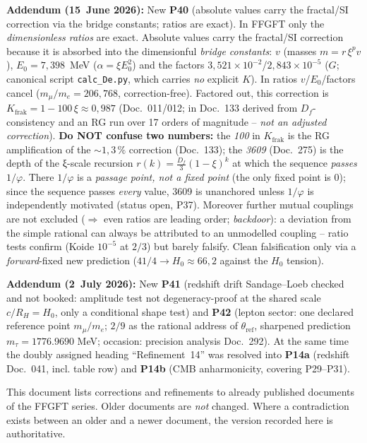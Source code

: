 \textbf{Addendum (15~June 2026):} New \textbf{P40} (absolute values carry the
fractal/SI correction via the bridge constants; ratios are exact). In FFGFT only the
\emph{dimensionless ratios} are exact. Absolute values carry the fractal/SI correction
because it is absorbed into the dimensionful \emph{bridge constants}: $v$ (masses
$m=r\,\xi^{p}v$), $E_0=7{,}398$~MeV ($\alpha=\xi E_0^2$) and the factors
$3{,}521\times10^{-2}$/$2{,}843\times10^{-5}$ ($G$; canonical script \texttt{calc\_De.py},
which carries \emph{no} explicit $K$). In ratios $v$/$E_0$/factors cancel
($m_\mu/m_e=206{,}768$, correction-free). Factored out, this correction is
$K_{\text{frak}}=1-100\,\xi\approx0{,}987$ (Doc.~011/012; in Doc.~133 derived from
$D_f$-consistency and an RG run over 17 orders of magnitude -- \emph{not an adjusted
correction}). \textbf{Do NOT confuse two numbers:} the \emph{100} in $K_{\text{frak}}$ is
the RG amplification of the ${\sim}1{,}3\,\%$ correction (Doc.~133); the \emph{3609}
(Doc.~275) is the depth of the ξ-scale recursion $r(k)=\tfrac{D_f}{3}(1-\xi)^k$ at which the
sequence \emph{passes} $1/\varphi$. There $1/\varphi$ is a \emph{passage point, not a fixed
point} (the only fixed point is $0$); since the sequence passes \emph{every} value, 3609 is
unanchored unless $1/\varphi$ is independently motivated (status open, P37). Moreover further
mutual couplings are not excluded ($\Rightarrow$ even ratios are leading order;
\emph{backdoor}): a deviation from the simple rational can always be attributed to an
unmodelled coupling -- ratio tests confirm (Koide $10^{-5}$ at $2/3$) but barely falsify.
Clean falsification only via a \emph{forward}-fixed new prediction ($41/4 \to H_0 \approx
66{,}2$ against the $H_0$ tension).

\textbf{Addendum (2~July 2026):} New \textbf{P41} (redshift drift
Sandage--Loeb checked and not booked: amplitude test not degeneracy-proof at
the shared scale $c/R_H=H_0$, only a conditional shape test) and
\textbf{P42} (lepton sector: one declared reference point $m_\mu/m_e$;
$2/9$ as the rational address of $\theta_{\text{ref}}$, sharpened
prediction $m_\tau=1776.9690$ MeV; occasion: precision analysis Doc.~292).
At the same time the doubly assigned heading \enquote{Refinement~14} was
resolved into \textbf{P14a} (redshift Doc.~041, incl. table row) and
\textbf{P14b} (CMB anharmonicity, covering P29--P31).

\bigskip
This document lists corrections and refinements to already published documents
of the FFGFT series. Older documents are \emph{not} changed. Where a
contradiction exists between an older and a newer document, the version
recorded here is authoritative.

